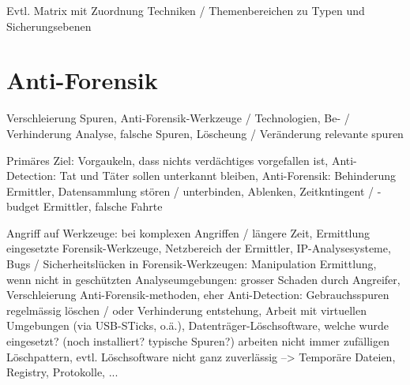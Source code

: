 Evtl. Matrix mit Zuordnung Techniken / Themenbereichen zu Typen und Sicherungsebenen

\section{Anti-Forensik}
Verschleierung Spuren, Anti-Forensik-Werkzeuge / Technologien, Be- / Verhinderung Analyse, falsche Spuren, Löscheung / Veränderung relevante spuren

Primäres Ziel: Vorgaukeln, dass nichts verdächtiges vorgefallen ist, Anti-Detection: Tat und Täter sollen unterkannt bleiben, Anti-Forensik: Behinderung Ermittler, Datensammlung stören / unterbinden, Ablenken, Zeitkntingent / -budget Ermittler, falsche Fahrte

Angriff auf Werkzeuge: bei komplexen Angriffen / längere Zeit, Ermittlung eingesetzte Forensik-Werkzeuge, Netzbereich der Ermittler, IP-Analysesysteme, Bugs / Sicherheitslücken in Forensik-Werkzeugen: Manipulation Ermittlung, wenn nicht in geschützten Analyseumgebungen: grosser Schaden durch Angreifer, Verschleierung Anti-Forensik-methoden, eher Anti-Detection: Gebrauchsspuren regelmässig löschen / oder Verhinderung entstehung, Arbeit mit virtuellen Umgebungen (via USB-STicks, o.ä.), Datenträger-Löschsoftware, welche wurde eingesetzt? (noch installiert? typische Spuren?) arbeiten nicht immer zufälligen Löschpattern, evtl. Löschsoftware nicht ganz zuverlässig --> Temporäre Dateien, Registry, Protokolle, ...
